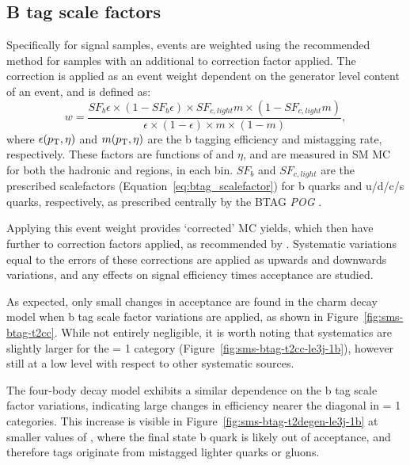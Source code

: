 \subsection{B tag scale factors}
Specifically for \FASTSIM signal samples, events are weighted using the
recommended method for \FULLSIM samples with an additional \FULLSIM to \FASTSIM 
correction factor applied. The \FULLSIM correction is applied as an event weight
dependent on the generator level content of an event, and is defined as:
% 
\begin{equation}
w = \frac{SF_b \epsilon \times (1-SF_b \epsilon) \times SF_{c,light} m \times (1
-SF_{c,light} m)}{\epsilon \times (1-\epsilon) \times m \times (1-m)} ,
\label{eq:btag_fullsim_weight}
\end{equation}
% 
where $\epsilon({p_{\text T}}, \eta)$ and $m({p_{\text T}}, \eta)$ are the b tagging efficiency and 
mistagging rate, respectively. These factors are functions of \Pt and $\eta$, and
are measured in SM MC for both the hadronic and \mj regions, in each \HT bin. $SF_b$
and $SF_{c,light}$ are the prescribed scalefactors (Equation~\ref{eq:btag_scalefactor})
for b quarks and u/d/c/s quarks, respectively, as prescribed centrally by the BTAG
\emph{POG} \cite{btagpog-scalefactors}.

Applying this event weight provides `corrected' MC yields, which then 
have further \FASTSIM to \FULLSIM correction factors applied, as recommended by
\cite{btagpogtwiki}.
Systematic variations equal to the errors of these corrections are applied as 
upwards and downwards variations, and any effects on signal efficiency times 
acceptance are studied.

As expected, only small changes in acceptance are found in the charm decay 
model when b tag scale factor variations are applied, as shown in
Figure~\ref{fig:sms-btag-t2cc}. While not entirely negligible, it is worth 
noting that systematics are slightly larger for the \nb= 1 category
(Figure~\ref{fig:sms-btag-t2cc-le3j-1b}), however still at a low level with 
respect to other systematic sources.

The four-body decay model exhibits a similar dependence on the b tag scale
factor variations, indicating large changes in efficiency nearer the diagonal in
\nb = 1 categories. This increase is visible in
Figure~\ref{fig:sms-btag-t2degen-le3j-1b} at smaller values of \deltam, where
the final state b quark is likely out of acceptance, and therefore tags
originate from mistagged lighter quarks or gluons.


